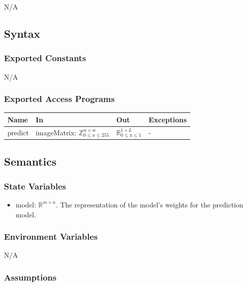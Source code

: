 \documentclass[12pt, titlepage]{article}
\begin{document}
N/A


\subsection{Syntax}

\subsubsection{Exported Constants}

N/A

\subsubsection{Exported Access Programs}

\begin{center}
\begin{tabular}{p{2cm} p{4cm} p{4cm} p{2cm}}
\hline
\textbf{Name} & \textbf{In} & \textbf{Out} & \textbf{Exceptions} \\
\hline
predict & imageMatrix: $\mathbb{Z}^{w \times w}_{0 \le x \le 255}$ & $\mathbb{R}_{\text{0} \leq \text{x} \leq \text{1}}^{1 \times L}$ & - \\
\hline
\end{tabular}
\end{center}

\subsection{Semantics}

\subsubsection{State Variables}

\begin{itemize}
  \item model: $\mathbb{R}^{m \times n}$. The representation of the model's
  weights for the prediction model.
\end{itemize}

\subsubsection{Environment Variables}

N/A

\subsubsection{Assumptions}
\end{document}
